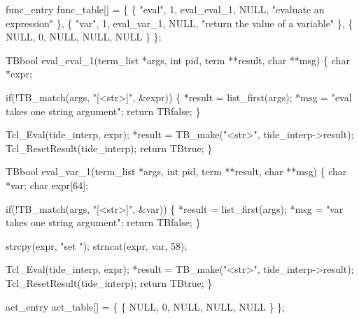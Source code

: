 func_entry func_table[] =
\{ \{ "eval", 1, eval_eval_1, NULL, "evaluate an expression" \},
  \{ "var", 1, eval_var_1, NULL, "return the value of a variable" \},
  \{ NULL, 0, NULL, NULL, NULL \}
\};
\nwendcode{}\nwdocspar

\nwenddocs{}\endmoddef\let\nwnotused=\nwoutput{}
TBbool eval_eval_1(term_list *args, int pid, term **result, char **msg)
\{
  char *expr;

  if(!TB_match(args, "[<str>]", &expr)) \{
    *result = list_first(args);
    *msg = "eval takes one string argument";
    return TBfalse;
  \}

  Tcl_Eval(tide_interp, expr);
  *result = TB_make("<str>", tide_interp->result);
  Tcl_ResetResult(tide_interp);
  return TBtrue;
\}
\nwendcode{}\nwdocspar

\nwenddocs{}\endmoddef\let\nwnotused=\nwoutput{}
TBbool eval_var_1(term_list *args, int pid, term **result, char **msg)
\{
  char *var;
  char expr[64];

  if(!TB_match(args, "[<str>]", &var)) \{
    *result = list_first(args);
    *msg = "var takes one string argument";
    return TBfalse;
  \}

  strcpy(expr, "set ");
  strncat(expr, var, 58);

  Tcl_Eval(tide_interp, expr);
  *result = TB_make("<str>", tide_interp->result);
  Tcl_ResetResult(tide_interp);
  return TBtrue;
\}
\nwendcode{}\nwdocspar


\nwenddocs{}\endmoddef
act_entry act_table[] =
\{ \{ NULL, 0, NULL, NULL, NULL \}
\};
\nwendcode{}\nwdocspar


